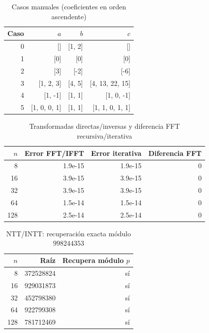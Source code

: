 \begin{table}[htbp]\centering\small
\caption{Casos manuales (coeficientes en orden ascendente)}
\label{tab:manuales}
\begin{tabular}{rrrr}\toprule
Caso & $a$ & $b$ & $c$ \\
\midrule
0 & [] & [1, 2] & [] \\
1 & [0] & [0] & [0] \\
2 & [3] & [-2] & [-6] \\
3 & [1, 2, 3] & [4, 5] & [4, 13, 22, 15] \\
4 & [1, -1] & [1, 1] & [1, 0, -1] \\
5 & [1, 0, 0, 1] & [1, 1] & [1, 1, 0, 1, 1] \\
\bottomrule\end{tabular}\end{table}

\begin{table}[htbp]\centering\small
\caption{Transformadas directas/inversas y diferencia FFT recursiva/iterativa}
\label{tab:validacion_fft}
\begin{tabular}{rrrr}\toprule
$n$ & Error FFT/IFFT & Error iterativa & Diferencia FFT \\
\midrule
8 & 1.9e-15 & 1.9e-15 & 0 \\
16 & 3.9e-15 & 3.9e-15 & 0 \\
32 & 3.9e-15 & 3.9e-15 & 0 \\
64 & 1.5e-14 & 1.5e-14 & 0 \\
128 & 2.5e-14 & 2.5e-14 & 0 \\
\bottomrule\end{tabular}\end{table}

\begin{table}[htbp]\centering\small
\caption{NTT/INTT: recuperación exacta módulo $998244353$}
\label{tab:validacion_ntt}
\begin{tabular}{rrr}\toprule
$n$ & Raíz & Recupera módulo $p$ \\
\midrule
8 & 372528824 & sí \\
16 & 929031873 & sí \\
32 & 452798380 & sí \\
64 & 922799308 & sí \\
128 & 781712469 & sí \\
\bottomrule\end{tabular}\end{table}

